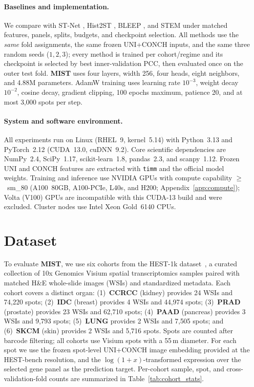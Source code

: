 \documentclass[11pt]{article}
\newcommand{\morph}{\textbf{MIST}}
\begin{document}
\paragraph{Baselines and implementation.}
We compare with ST-Net \cite{he2020stnet}, Hist2ST \cite{zeng2022hist2st}, BLEEP \cite{xie2023bleep},
and STEM \cite{zhu2025diffusion} under matched features, panels, splits, budgets, and checkpoint
selection. All methods use the \emph{same} fold assignments, the same frozen UNI+CONCH inputs, and the
same three random seeds ($1,2,3$); every method is trained per cohort/regime and its checkpoint is
selected by best inner-validation PCC, then evaluated once on the outer test fold. \morph{} uses four
layers, width 256, four heads, eight neighbors, and 4.88M parameters.
AdamW training uses learning rate $10^{-3}$, weight decay $10^{-2}$, cosine decay, gradient clipping,
100 epochs maximum, patience 20, and at most 3,000 spots per step.

\paragraph{System and software environment.}
All experiments run on Linux (RHEL~9, kernel~5.14) with Python~3.13 and PyTorch~2.12 (CUDA~13.0,
cuDNN~9.2). Core scientific dependencies are NumPy~2.4, SciPy~1.17, scikit-learn~1.8, pandas~2.3, and
scanpy~1.12. Frozen UNI and CONCH features are extracted with \texttt{timm} and the official model
weights. Training and inference use NVIDIA GPUs with compute capability $\geq$~sm\_80 (A100~80GB,
A100-PCIe, L40s, and H200; Appendix~\ref{app:compute}); Volta (V100) GPUs are incompatible with this
CUDA-13 build and were excluded. Cluster nodes use Intel Xeon Gold~6140 CPUs.

\section{Dataset}
\label{app:cohort_stats}

To evaluate \morph{}, we use six cohorts from the HEST-1k dataset~\cite{jaume2024hest}, a curated
collection of 10x Genomics Visium spatial transcriptomics samples paired with matched H\&E whole-slide
images (WSIs) and standardized metadata. Each cohort covers a distinct organ:
(1)~\textbf{CCRCC} (kidney) provides 24 WSIs and 74{,}220 spots;
(2)~\textbf{IDC} (breast) provides 4 WSIs and 44{,}974 spots;
(3)~\textbf{PRAD} (prostate) provides 23 WSIs and 62{,}710 spots;
(4)~\textbf{PAAD} (pancreas) provides 3 WSIs and 9{,}793 spots;
(5)~\textbf{LUNG} provides 2 WSIs and 7{,}505 spots; and
(6)~\textbf{SKCM} (skin) provides 2 WSIs and 5{,}716 spots.
Spots are counted after barcode filtering; all cohorts use Visium spots with a 55\,\textmu m diameter.
For each spot we use the frozen spot-level UNI+CONCH image embedding provided at the HEST-bench
resolution, and the $\log(1+x)$-transformed expression over the selected gene panel as the prediction
target. Per-cohort sample, spot, and cross-validation-fold counts are summarized in
Table~\ref{tab:cohort_stats}.
\end{document}
